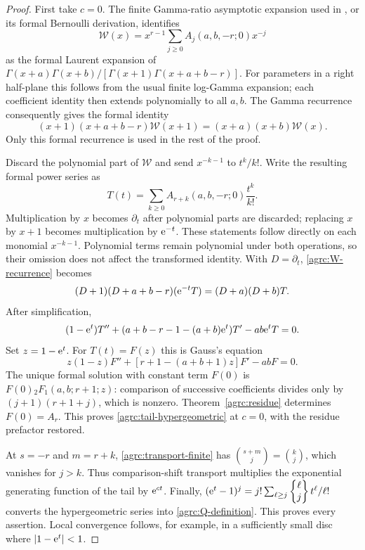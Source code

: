 \begin{proof}
First take $c=0$. The finite Gamma-ratio asymptotic expansion used in
\cite{repo-gauss}, or its formal Bernoulli derivation, identifies
\begin{equation}\label{agrc:formalW}
 \mathscr W(x)=x^{r-1}\sum_{j\geq0}A_j(a,b,-r;0)x^{-j}
\end{equation}
as the formal Laurent expansion of
$\Gamma(x+a)\Gamma(x+b)/[\Gamma(x+1)\Gamma(x+a+b-r)]$.
For parameters in a right half-plane this follows from the usual finite
log-Gamma expansion; each coefficient identity then extends polynomially
to all $a,b$. The Gamma recurrence consequently gives the formal identity
\begin{equation}\label{agrc:W-recurrence}
 (x+1)(x+a+b-r)\mathscr W(x+1)
       =(x+a)(x+b)\mathscr W(x).
\end{equation}
Only this formal recurrence is used in the rest of the proof.

Discard the polynomial part of $\mathscr W$ and send
$x^{-k-1}$ to $t^k/k!$. Write the resulting formal power series as
\begin{equation}\label{agrc:T-borel}
 T(t)=\sum_{k\geq0}A_{r+k}(a,b,-r;0)\frac{t^k}{k!}.
\end{equation}
Multiplication by $x$ becomes $\partial_t$ after polynomial parts are
discarded; replacing $x$ by $x+1$ becomes multiplication by $\mathrm e^{-t}$.
These statements follow directly on each monomial $x^{-k-1}$.
Polynomial terms remain polynomial under both operations, so their
omission does not affect the transformed identity. With $D=\partial_t$,
\eqref{agrc:W-recurrence} becomes
\[
 (D+1)(D+a+b-r)(\mathrm e^{-t}T)=(D+a)(D+b)T.
\]
After simplification,
\begin{equation}\label{agrc:T-ODE}
 (1-\mathrm e^t)T''+
       (a+b-r-1-(a+b)\mathrm e^t)T'-ab\mathrm e^tT=0.
\end{equation}
Set $z=1-\mathrm e^t$. For $T(t)=F(z)$ this is Gauss's equation
\begin{equation}\label{agrc:Gauss-ODE}
 z(1-z)F''+[r+1-(a+b+1)z]F'-abF=0.
\end{equation}
The unique formal solution with constant term $F(0)$ is
$F(0){}_2F_1(a,b;r+1;z)$: comparison of successive coefficients divides
only by $(j+1)(r+1+j)$, which is nonzero. Theorem~\ref{agrc:residue}
determines $F(0)=A_r$. This proves \eqref{agrc:tail-hypergeometric}
at $c=0$, with the residue prefactor restored.

At $s=-r$ and $m=r+k$, \eqref{agrc:transport-finite} has
$\binom{s+m}{j}=\binom{k}{j}$, which vanishes for $j>k$.
Thus comparison-shift transport multiplies the exponential generating
function of the tail by $\mathrm e^{ct}$.
Finally,
$(\mathrm e^t-1)^j=j!\sum_{\ell\geq j}\left\{\begin{matrix}\ell\\j\end{matrix}\right\}t^\ell/\ell!$
converts the hypergeometric series into \eqref{agrc:Q-definition}.
This proves every assertion. Local convergence follows, for example,
in a sufficiently small disc where $|1-\mathrm e^t|<1$.
\end{proof}

